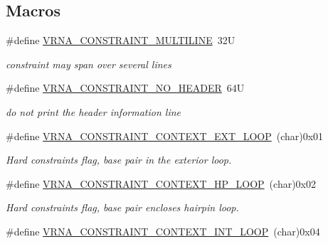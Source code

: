 \subsection*{Macros}
\begin{DoxyCompactItemize}
\item 
\hypertarget{group__hard__constraints_ga7d725ef525b29891abef3f1ed42599a4}{\#define \hyperlink{group__hard__constraints_ga7d725ef525b29891abef3f1ed42599a4}{V\-R\-N\-A\-\_\-\-C\-O\-N\-S\-T\-R\-A\-I\-N\-T\-\_\-\-M\-U\-L\-T\-I\-L\-I\-N\-E}~32\-U}\label{group__hard__constraints_ga7d725ef525b29891abef3f1ed42599a4}

\begin{DoxyCompactList}\small\item\em constraint may span over several lines \end{DoxyCompactList}\item 
\hypertarget{group__hard__constraints_ga08d12a9a846ea593b7171d277c9f033f}{\#define \hyperlink{group__hard__constraints_ga08d12a9a846ea593b7171d277c9f033f}{V\-R\-N\-A\-\_\-\-C\-O\-N\-S\-T\-R\-A\-I\-N\-T\-\_\-\-N\-O\-\_\-\-H\-E\-A\-D\-E\-R}~64\-U}\label{group__hard__constraints_ga08d12a9a846ea593b7171d277c9f033f}

\begin{DoxyCompactList}\small\item\em do not print the header information line \end{DoxyCompactList}\item 
\hypertarget{group__hard__constraints_ga9418eda62a5dec070896702c279d2548}{\#define \hyperlink{group__hard__constraints_ga9418eda62a5dec070896702c279d2548}{V\-R\-N\-A\-\_\-\-C\-O\-N\-S\-T\-R\-A\-I\-N\-T\-\_\-\-C\-O\-N\-T\-E\-X\-T\-\_\-\-E\-X\-T\-\_\-\-L\-O\-O\-P}~(char)0x01}\label{group__hard__constraints_ga9418eda62a5dec070896702c279d2548}

\begin{DoxyCompactList}\small\item\em Hard constraints flag, base pair in the exterior loop. \end{DoxyCompactList}\item 
\hypertarget{group__hard__constraints_ga79203702b197b6b9d3b78eed40663eb1}{\#define \hyperlink{group__hard__constraints_ga79203702b197b6b9d3b78eed40663eb1}{V\-R\-N\-A\-\_\-\-C\-O\-N\-S\-T\-R\-A\-I\-N\-T\-\_\-\-C\-O\-N\-T\-E\-X\-T\-\_\-\-H\-P\-\_\-\-L\-O\-O\-P}~(char)0x02}\label{group__hard__constraints_ga79203702b197b6b9d3b78eed40663eb1}

\begin{DoxyCompactList}\small\item\em Hard constraints flag, base pair encloses hairpin loop. \end{DoxyCompactList}\item 
\hypertarget{group__hard__constraints_ga21feeab3a9e5fa5a9e3d9ac0fcf5994f}{\#define \hyperlink{group__hard__constraints_ga21feeab3a9e5fa5a9e3d9ac0fcf5994f}{V\-R\-N\-A\-\_\-\-C\-O\-N\-S\-T\-R\-A\-I\-N\-T\-\_\-\-C\-O\-N\-T\-E\-X\-T\-\_\-\-I\-N\-T\-\_\-\-L\-O\-O\-P}~(char)0x04}\label{group__hard__constraints_ga21feeab3a9e5fa5a9e3d9ac0fcf5994f}


\end{DoxyCompactItemize}
